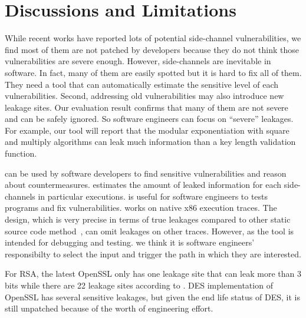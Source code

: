 \section{Discussions and Limitations}
While recent works have reported lots
of potential side-channel vulnerabilities, we find most of them are not patched by
developers because they do not think those vulnerabilities are severe enough.
However, side-channels are inevitable in software. In fact, many of them
are easily spotted but it is hard to fix all of them. They need a
tool that can automatically estimate the sensitive level of each vulnerabilities.
Second, addressing old vulnerabilities may also introduce new leakage
sites. Our evaluation result confirms that many of them are not 
severe and can be safely ignored. So software engineers can focus on
``severe'' leakages. For example, our tool will report that 
the modular exponentiation with square and multiply algorithms can
leak much information than a key length validation function.

\tool{} can be used by software developers to find sensitive vulnerabilities
and reason about countermeasures.
\tool{} estimates the amount of leaked information for each side-channels
in particular executions. \tool{} is useful for software
engineers to tests programs and fix vulnerabilities.
\tool{} works on native x86 execution traces. The design, which is very
precise in terms of true leakages compared to other static source code
method~\cite{197207,BacelarAlmeida:2013:FVS:2483313.2483334}, can omit
leakages on other traces. However, as the tool is intended for debugging and testing.
we think it is software engineers' responsibilty to select the input and trigger the 
path in which they are interested.


For RSA, the latest
OpenSSL only has one leakage site that can leak more than 3 bits while there
are 22 leakage sites according to \tool{}. DES implementation of OpenSSL has
several sensitive leakages, but given the end life status of DES, it is still
unpatched because of the worth of engineering effort. 
%

